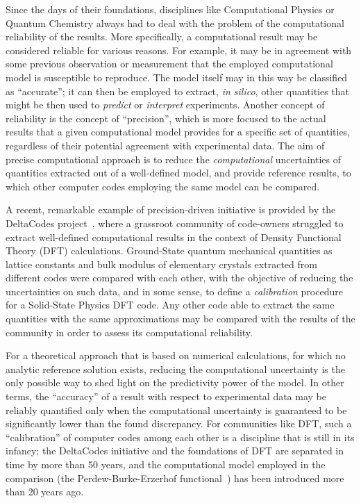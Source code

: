 \documentclass[reprint,aps,prb]{revtex4-1}
\begin{document}
Since the days of their foundations, disciplines like Computational Physics or Quantum Chemistry always had to deal with the problem of the
computational reliability of the results. More specifically, a computational result may be considered reliable for various reasons.
For example, it may be in agreement with some previous observation or measurement that the employed computational model is susceptible to reproduce.
The model itself may in this way be classified as ``accurate''; it can then be employed to extract, \textit{in silico},
other quantities that might be then used to \emph{predict} or \emph{interpret} experiments.
Another concept of reliability is the concept of  ``precision'', which is more focused to the actual results
that a given computational model provides for a specific set of quantities, regardless of their potential agreement with
experimental data. The aim of precise computational approach is to reduce the \emph{computational} uncertainties
of quantities extracted out of a well-defined model, and provide reference results, to which other computer codes
employing the same model can be compared.

A recent, remarkable example of precision-driven initiative is provided by the DeltaCodes project~\cite{deltaTest2016},
where a grassroot community of code-owners struggled to extract well-defined computational results in the context of
Density Functional Theory (DFT) calculations. Ground-State quantum mechanical quantities as lattice constants and bulk modulus of
elementary crystals extracted from different codes were compared with each other, with the objective of reducing the uncertainties
on such data, and in some sense, to define a \emph{calibration} procedure for a Solid-State Physics DFT code.
Any other code able to extract the same quantities with the same approximations may be compared with the
results of the community in order to assess its computational reliability.

For a theoretical approach that is based on numerical calculations, for which no analytic reference solution exists,
reducing the computational uncertainty is the only possible way to shed light on the predictivity power of the
model. In other terms, the ``accuracy'' of a result with respect to experimental data may be reliably quantified
only when the computational uncertainty is guaranteed to be significantly lower than the found discrepancy.
For communities like DFT, such a ``calibration'' of computer codes among each other is a discipline that is still in its infancy;
the DeltaCodes initiative and the foundations of DFT are separated in time by more than 50 years, and the computational
model employed in the comparison (the Perdew-Burke-Erzerhof functional~\cite{PBE}) has been introduced more than 20 years ago.
\end{document}
